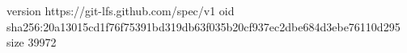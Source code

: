 version https://git-lfs.github.com/spec/v1
oid sha256:20a13015cd1f76f75391bd319db63f035b20cf937ec2dbe684d3ebe76110d295
size 39972

